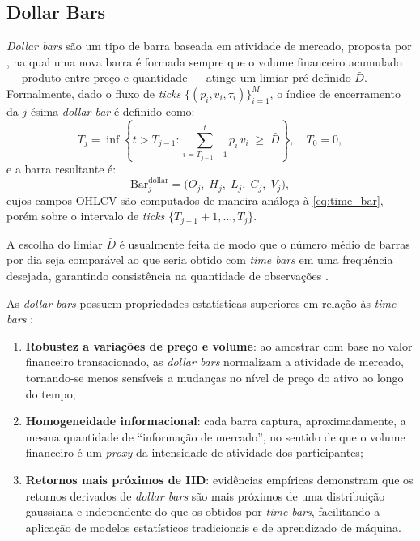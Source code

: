 \subsection{Dollar Bars}
\label{subsec:dollar_bars}

\emph{Dollar bars} são um tipo de barra baseada em atividade de mercado,
proposta por , na qual uma nova barra é formada
sempre que o volume financeiro acumulado --- produto entre preço e
quantidade --- atinge um limiar pré-definido $\bar{D}$. Formalmente, dado o
fluxo de \emph{ticks} $\{(p_i, v_i, \tau_i)\}_{i=1}^{M}$, o índice de
encerramento da $j$-ésima \emph{dollar bar} é definido como:
%
\begin{equation}
    \label{eq:dollar_bar_idx}
    T_j = \inf\left\{t > T_{j-1} :
    \sum_{i=T_{j-1}+1}^{t} p_i \, v_i \;\ge\; \bar{D}\right\},
    \quad T_0 = 0,
\end{equation}
%
e a barra resultante é:
%
\begin{equation}
    \label{eq:dollar_bar}
    \text{Bar}_j^{\text{dollar}} =
    \bigl(O_j,\; H_j,\; L_j,\; C_j,\; V_j\bigr),
\end{equation}
%
cujos campos OHLCV são computados de maneira análoga à \autoref{eq:time_bar},
porém sobre o intervalo de \emph{ticks}
$\{T_{j-1}+1, \ldots, T_j\}$.

A escolha do limiar $\bar{D}$ é usualmente feita de modo que o número médio
de barras por dia seja comparável ao que seria obtido com \emph{time bars} em
uma frequência desejada, garantindo consistência na quantidade de
observações \cite{lopez2018advances}.

As \emph{dollar bars} possuem propriedades estatísticas superiores em relação
às \emph{time bars} \cite{lopez2018advances}:

\begin{enumerate}[label=\roman*)]
    \item \textbf{Robustez a variações de preço e volume}: ao amostrar com
          base no valor financeiro transacionado, as \emph{dollar bars}
          normalizam a atividade de mercado, tornando-se menos sensíveis a
          mudanças no nível de preço do ativo ao longo do tempo;
    \item \textbf{Homogeneidade informacional}: cada barra captura,
          aproximadamente, a mesma quantidade de ``informação de mercado'',
          no sentido de que o volume financeiro é um \emph{proxy} da
          intensidade de atividade dos participantes;
    \item \textbf{Retornos mais próximos de IID}: evidências empíricas
          demonstram que os retornos derivados de \emph{dollar bars} são mais
          próximos de uma distribuição gaussiana e independente do que os
          obtidos por \emph{time bars}, facilitando a aplicação de modelos
          estatísticos tradicionais e de aprendizado de máquina.
\end{enumerate}


